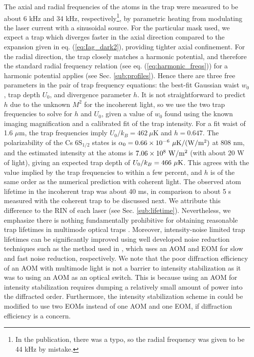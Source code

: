 The axial and radial frequencies of the atoms in the trap were measured to be about 6 kHz and 34 kHz, respectively\footnote{In the publication, there was a typo, so the radial frequency was given to be 44 kHz by mistake.}, by parametric heating from modulating the laser current with a sinusoidal source. For the particular mask used, we expect a trap which diverges faster in the axial direction compared to the expansion given in eq. (\ref{eq:Iag_dark2}), providing tighter axial confinement. For the radial direction, the trap closely matches a harmonic potential, and therefore the standard radial frequency relation (see eq. (\ref{eq:harmonic_freqs})) for a harmonic potential applies (see Sec. \ref{sub:profiles}). Hence there are three free parameters in the pair of trap frequency equations: the best-fit Gaussian waist $w_0$, trap depth $U_0$, and divergence parameter $h$. It is not straightforward to predict $h$ due to the unknown $M^2$ for the incoherent light, so we use the two trap frequencies to solve for $h$ and $U_0$, given a value of $w_0$ found using the known imaging magnification and a calibrated fit of the trap intensity. For a fit waist of 1.6 $\mu$m, the trap frequencies imply $U_0/k_B=462 ~\mu$K and $h=0.647$. The polarizability of the Cs $6\text{S}_{1/2}$ states is
$\alpha_0 = 0.66\times10^{-6} ~\mu\text K/(\text W/\text m^2)$ at 808 nm, and the estimated intensity at the atoms is $7.06 \times 10^8~\text W/ \text m^2$ (with about 20 W of light), giving an expected trap depth of $U_0/k_B=466 ~\mu \text K$. This agrees with the value implied by the trap frequencies to within a few percent, and $h$ is of the same order as the numerical prediction with coherent light. 
The observed atom lifetime in the incoherent trap was about 40 ms, in comparison to about 5 s measured with the coherent trap to be discussed next. We attribute this difference to the RIN of each laser (see Sec. \ref{sub:lifetime}). Nevertheless, we emphasize there is nothing fundamentally prohibitive for obtaining reasonable trap lifetimes in  multimode optical traps \cite{WHung2015,Povilus2005}. Moreover, intensity-noise limited trap lifetimes can be significantly improved  using well developed noise reduction techniques such as the method used in \cite{YuWang2020}, which uses an AOM and EOM for slow and fast noise reduction, respectively. We note that the poor diffraction efficiency of an AOM with multimode light is not a barrier to intensity stabilization as it was to using an AOM as an optical switch. This is because using an AOM for intensity stabilization requires dumping a relatively small amount of power into the diffracted order. Furthermore, the intensity stabilization scheme in \cite{YuWang2020} could be modified to use two EOMs instead of one AOM and one EOM, if diffraction efficiency is a concern. 

